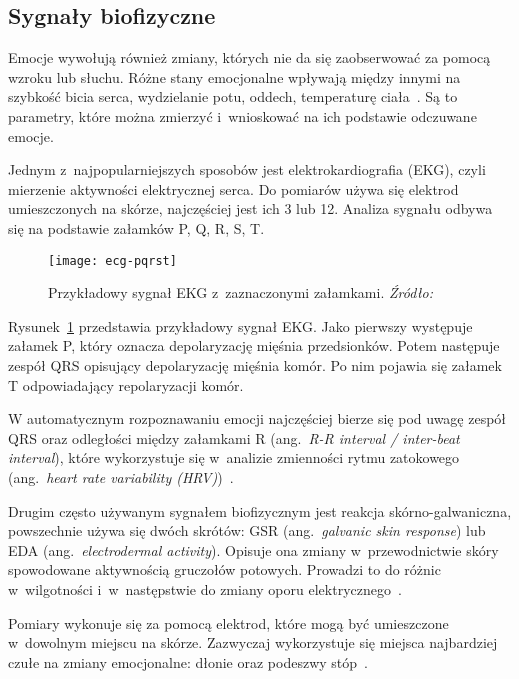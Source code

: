 \subsection{Sygnały biofizyczne}\label{subsec:sygnaly-biofizyczne}

Emocje wywołują również zmiany, których nie da się zaobserwować za pomocą wzroku lub słuchu.
Różne stany emocjonalne wpływają między innymi na szybkość bicia serca, wydzielanie potu, oddech, temperaturę ciała~\cite{Calvo2015}.
Są to parametry, które można zmierzyć i~wnioskować na ich podstawie odczuwane emocje.

Jednym z~najpopularniejszych sposobów jest elektrokardiografia (EKG), czyli mierzenie aktywności elektrycznej serca.
Do pomiarów używa się elektrod umieszczonych na skórze, najczęściej jest ich 3 lub 12.
Analiza sygnału odbywa się na podstawie załamków P, Q, R, S, T\@.

\begin{figure}[h]
    \centering
    \texttt{[image: ecg-pqrst]}
    \caption{Przykładowy sygnał EKG z~zaznaczonymi załamkami. \textit{Źródło:~\cite{Dzedzickis2020}}}
    \label{fig:ecg-pqrst}
\end{figure}

Rysunek~\ref{fig:ecg-pqrst} przedstawia przykładowy sygnał EKG\@.
Jako pierwszy występuje załamek P, który oznacza depolaryzację mięśnia przedsionków.
Potem następuje zespół QRS opisujący depolaryzację mięśnia komór.
Po nim pojawia się załamek T odpowiadający repolaryzacji komór.

W automatycznym rozpoznawaniu emocji najczęściej bierze się pod uwagę zespół QRS oraz odległości między załamkami R (ang.~\textit{R-R interval / inter-beat interval}), które wykorzystuje się w~analizie zmienności rytmu zatokowego (ang.~\textit{heart rate variability (HRV)})~\cite{Calvo2015}.

Drugim często używanym sygnałem biofizycznym jest reakcja skórno-galwaniczna, powszechnie używa się dwóch skrótów: GSR (ang.~\textit{galvanic skin response}) lub EDA (ang.~\textit{electrodermal activity}).
Opisuje ona zmiany w~przewodnictwie skóry spowodowane aktywnością gruczołów potowych.
Prowadzi to do różnic w~wilgotności i~w~następstwie do zmiany oporu elektrycznego~\cite{Dzedzickis2020}.

Pomiary wykonuje się za pomocą elektrod, które mogą być umieszczone w~dowolnym miejscu na skórze.
Zazwyczaj wykorzystuje się miejsca najbardziej czułe na zmiany emocjonalne: dłonie oraz podeszwy stóp~\cite{Calvo2015}.

